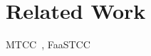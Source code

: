 
\section{Related Work} \label{section:related-work}


MTCC~\cite{MTCC:SIGMOD2020}, FaaSTCC~\cite{FaaSTCC:Middleware2021}
